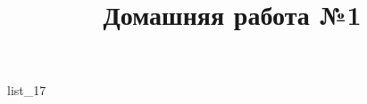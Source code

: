 \documentclass[12pt, a4paper]{article}
\begin{document}
	\title{Домашняя работа №1}
	{list_17}
\end{document}
